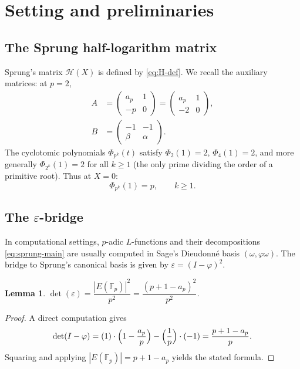 \documentclass[11pt,a4paper]{amsart}
\newtheorem{lemma}[theorem]{Lemma}
\theoremstyle{definition}
\newcommand{\F}{\mathbb{F}}
\newcommand{\eps}{\varepsilon}
\newcommand{\Hcal}{\mathcal{H}}
\begin{document}
\section{Setting and preliminaries}\label{sec:setting}

\subsection{The Sprung half-logarithm matrix}\label{ssec:H-def}

Sprung's matrix $\Hcal(X)$ is defined by \eqref{eq:H-def}. We recall the auxiliary matrices: at $p = 2$,
\begin{align}
A &= \begin{pmatrix} a_p & 1 \\ -p & 0 \end{pmatrix} = \begin{pmatrix} a_p & 1 \\ -2 & 0 \end{pmatrix}, \\
B &= \begin{pmatrix} -1 & -1 \\ \beta & \alpha \end{pmatrix}.
\end{align}
The cyclotomic polynomials $\Phi_{p^k}(t)$ satisfy $\Phi_2(1) = 2$, $\Phi_4(1) = 2$, and more generally $\Phi_{2^k}(1) = 2$ for all $k \geq 1$ (the only prime dividing the order of a primitive root). Thus at $X = 0$:
\begin{equation}\label{eq:Phi-at-1}
\Phi_{p^k}(1) = p, \qquad k \geq 1.
\end{equation}

\subsection{The $\eps$-bridge}\label{ssec:eps-bridge}

In computational settings, $p$-adic $L$-functions and their decompositions \eqref{eq:sprung-main} are usually computed in Sage's Dieudonné basis $(\omega, \varphi\omega)$. The bridge to Sprung's canonical basis is given by $\eps = (I - \varphi)^2$.

\begin{lemma}\label{lem:det-eps}
$\det(\eps) = \dfrac{|E(\F_p)|^2}{p^2} = \dfrac{(p + 1 - a_p)^2}{p^2}$.
\end{lemma}

\begin{proof}
A direct computation gives
\[
\det(I - \varphi) = (1)\cdot\Bigl(1 - \frac{a_p}{p}\Bigr) - \Bigl(\frac{1}{p}\Bigr)\cdot(-1) = \frac{p + 1 - a_p}{p}.
\]
Squaring and applying $|E(\F_p)| = p + 1 - a_p$ yields the stated formula.
\end{proof}
\end{document}
